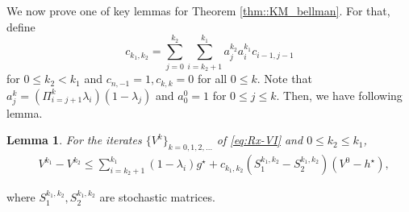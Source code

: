 \documentclass{article} %
\newcommand*{\para}[1]{\left({#1}\right)}
\newtheorem{lemma}{Lemma}
\begin{document}
We now prove one of key lemmas for Theorem \ref{thm::KM_bellman}. For that, define %
\[c_{k_1,k_2} = \sum^{k_2}_{j=0}\sum^{k_1}_{i=k_2+1} a^{k_2}_j  a^{k_1}_i c_{i-1,j-1}\]
for $0 \le k_2 <k_1 $ and $c_{n,-1}=1, c_{k,k}=0$ for all $0 \le k$. Note that  $a^k_{j} = \para{\Pi^{k}_{i=j+1}\lambda_{i}}(1-\lambda_{j})$ and $a^0_0=1$ for $ 0 \le  j \le k$. 
Then, we have following lemma. 
\begin{lemma}\label{lem::KM_upper_bd}
For the iterates $\{V^k\}_{k=0, 1,2,\dots}$ of \ref{eq:Rx-VI} and $0 \le k_2 \le k_1$,
    \begin{align*}
       &V^{k_1}-V^{k_2}  \le  \sum^{k_1}_{i=k_2+1} (1-\lambda_{i})g^{\star}+c_{k_1, k_2}(S^{k_1,k_2}_{1}-S^{k_1,k_2}_{2})(V^0-h^{\star}) ,
    \end{align*}
\end{lemma}
where $S^{k_1,k_2}_1,S^{k_1,k_2}_2$ are stochastic matrices.
\end{document}
